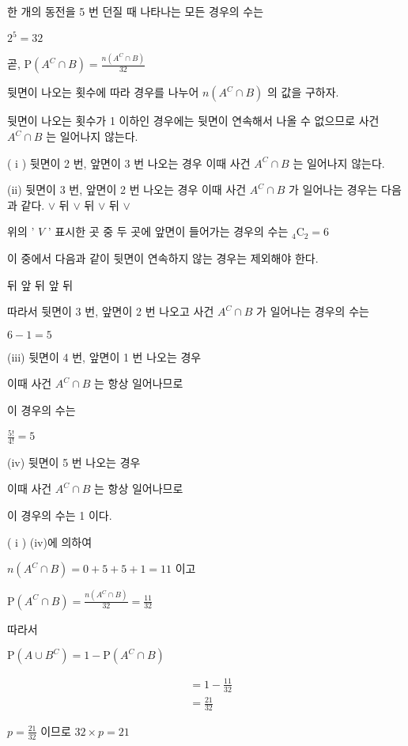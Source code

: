 \documentclass[10pt]{article}
\begin{document}
한 개의 동전을 5 번 던질 때 나타나는 모든 경우의 수는

\(2^{5}=32\)

곧, \(\mathrm{P}\left(A^{C} \cap B\right)=\frac{n\left(A^{C} \cap B\right)}{32}\)

뒷면이 나오는 횟수에 따라 경우를 나누어 \(n\left(A^{C} \cap B\right)\) 의 값을 구하자.

뒷면이 나오는 횟수가 1 이하인 경우에는 뒷면이 연속해서 나올 수 없으므로 사건 \(A^{C} \cap B\) 는 일어나지 않는다.

( i ) 뒷면이 2 번, 앞면이 3 번 나오는 경우 이때 사건 \(A^{C} \cap B\) 는 일어나지 않는다.

(ii) 뒷면이 3 번, 앞면이 2 번 나오는 경우 이때 사건 \(A^{C} \cap B\) 가 일어나는 경우는 다음과 같다. \(\vee\) 뒤 \(\vee\) 뒤 \(\vee\) 뒤 \(\vee\)

위의 ' \(V\) ' 표시한 곳 중 두 곳에 앞면이 들어가는 경우의 수는 \({ }_{4} \mathrm{C}_{2}=6\)

이 중에서 다음과 같이 뒷면이 연속하지 않는 경우는 제외해야 한다.

뒤 앞 뒤 앞 뒤

따라서 뒷면이 3 번, 앞면이 2 번 나오고 사건 \(A^{C} \cap B\) 가 일어나는 경우의 수는

\(6-1=5\)

(iii) 뒷면이 4 번, 앞면이 1 번 나오는 경우

이때 사건 \(A^{C} \cap B\) 는 항상 일어나므로

이 경우의 수는

\(\frac{5!}{4!}=5\)

(iv) 뒷면이 5 번 나오는 경우

이때 사건 \(A^{C} \cap B\) 는 항상 일어나므로

이 경우의 수는 1 이다.

( i ) (iv)에 의하여

\(n\left(A^{C} \cap B\right)=0+5+5+1=11\) 이고

\(\mathrm{P}\left(A^{C} \cap B\right)=\frac{n\left(A^{C} \cap B\right)}{32}=\frac{11}{32}\)

따라서

\(\mathrm{P}\left(A \cup B^{C}\right)=1-\mathrm{P}\left(A^{C} \cap B\right)\)

\[
\begin{aligned}
& =1-\frac{11}{32} \\
& =\frac{21}{32}
\end{aligned}
\]

\(p=\frac{21}{32}\) 이므로 \(32 \times p=21\)
\end{document}
